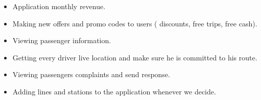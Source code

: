 \begin{itemize}
\begin{itemize}
    \item Application monthly revenue.
    \item Making new offers and promo codes to users ( discounts, free trips, free cash).
    \item Viewing passenger information.
    \item Getting every driver live location and make sure he is committed to his route.
    \item Viewing passengers complaints and send response.
    \item Adding lines and stations to the application whenever we decide.
    \end{itemize}
    

\end{itemize}